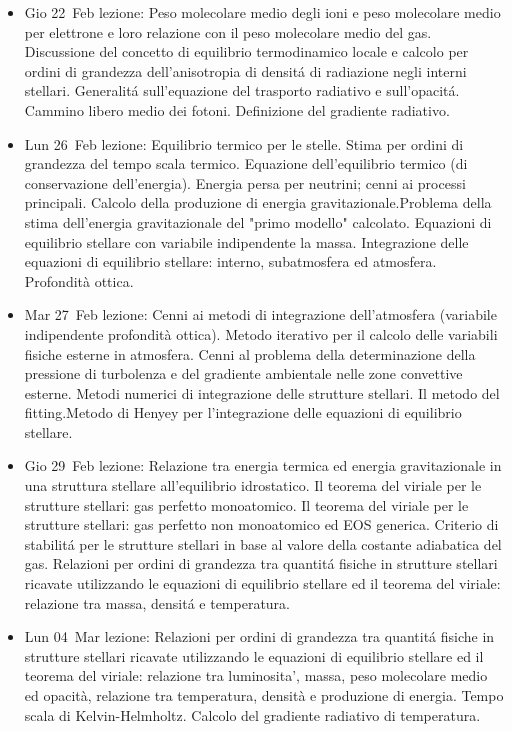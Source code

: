 \begin{itemize}
\item Gio 22 Feb lezione: Peso molecolare medio degli ioni e peso molecolare medio per elettrone e loro relazione con il peso molecolare medio del gas. Discussione del concetto di equilibrio termodinamico locale e calcolo per ordini di grandezza dell'anisotropia di densit\'a di radiazione negli interni stellari. Generalit\'a sull'equazione del trasporto radiativo e sull'opacit\'a. Cammino libero medio dei fotoni. Definizione del gradiente radiativo. 
\item Lun 26 Feb lezione: Equilibrio termico per le stelle. Stima per ordini di grandezza del tempo scala termico. Equazione dell'equilibrio termico (di conservazione dell'energia). Energia persa per neutrini; cenni ai processi principali. Calcolo della produzione di energia gravitazionale.Problema della stima dell'energia gravitazionale del "primo modello" calcolato. Equazioni di equilibrio stellare con variabile indipendente la massa. Integrazione delle equazioni di equilibrio stellare: interno, subatmosfera ed atmosfera. Profondità ottica. 
\item Mar 27 Feb lezione: Cenni ai metodi di integrazione dell'atmosfera (variabile indipendente profondità ottica). Metodo iterativo per il calcolo delle variabili fisiche esterne in atmosfera. Cenni al problema della determinazione della pressione di turbolenza e del gradiente ambientale nelle zone convettive esterne. Metodi numerici di integrazione delle strutture stellari. Il metodo del fitting.Metodo di Henyey per l'integrazione delle equazioni di equilibrio stellare. 
\item Gio 29 Feb lezione: Relazione tra energia termica ed energia gravitazionale in una struttura stellare all'equilibrio idrostatico. Il teorema del viriale per le strutture stellari: gas perfetto monoatomico. Il teorema del viriale per le strutture stellari: gas perfetto non monoatomico ed EOS generica. Criterio di stabilit\'a per le strutture stellari in base al valore della costante adiabatica del gas. Relazioni per ordini di grandezza tra quantit\'a fisiche in strutture stellari ricavate utilizzando le equazioni di equilibrio stellare ed il teorema del viriale: relazione tra massa, densit\'a e temperatura. 
\item Lun 04 Mar lezione: Relazioni per ordini di grandezza tra quantit\'a fisiche in strutture stellari ricavate utilizzando le equazioni di equilibrio stellare ed il teorema del viriale: relazione tra luminosita', massa, peso molecolare medio ed opacità, relazione tra temperatura, densità e produzione di energia. Tempo scala di Kelvin-Helmholtz. Calcolo del gradiente radiativo di temperatura. 

\end{itemize}
